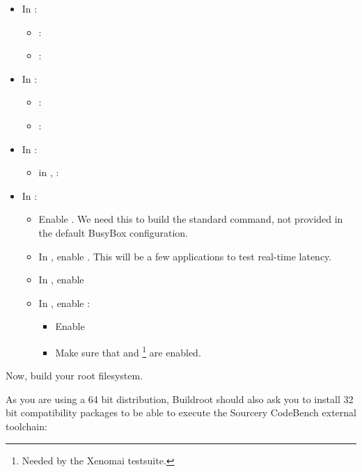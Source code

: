 \begin{itemize}
\item In :
   \begin{itemize}
   \item {}: 
   \item {}: 
   \end{itemize}
\item In :
   \begin{itemize}
   \item {}: 
   \item {}: 
   \end{itemize}
\item In :
   \begin{itemize}
   \item in ,  : 
   \end{itemize}
\item In :
   \begin{itemize}
   \item Enable .
         We need this to build the standard  command, not
         provided in the default BusyBox configuration.
   \item In , enable
         . This will be a few applications to test
         real-time latency.
   \item In , enable 
   \item In , enable :
         \begin{itemize}
         \item Enable 
	 \item Make sure that  and
	       \footnote{Needed by
	       the Xenomai testsuite.} are enabled.
  	 \end{itemize}
   \end{itemize}
\end{itemize}

Now, build your root filesystem.

As you are using a 64 bit distribution, Buildroot should also ask
you to install 32 bit compatibility packages to be able to execute the
Sourcery CodeBench external toolchain:

